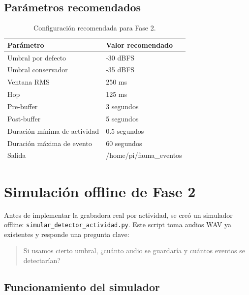 \documentclass[11pt,letterpaper]{article}
\newcommand{\archivo}[1]{\texttt{#1}}
\begin{document}
\subsection{Parámetros recomendados}

\begin{table}[H]
\centering
\begin{tabular}{ll}
\toprule
Parámetro & Valor recomendado \\
\midrule
Umbral por defecto & -30 dBFS \\
Umbral conservador & -35 dBFS \\
Ventana RMS & 250 ms \\
Hop & 125 ms \\
Pre-buffer & 3 segundos \\
Post-buffer & 5 segundos \\
Duración mínima de actividad & 0.5 segundos \\
Duración máxima de evento & 60 segundos \\
Salida & /home/pi/fauna\_eventos \\
\bottomrule
\end{tabular}
\caption{Configuración recomendada para Fase 2.}
\end{table}

\section{Simulación offline de Fase 2}

Antes de implementar la grabadora real por actividad, se creó un simulador offline: \archivo{simular\_detector\_actividad.py}. Este script toma audios WAV ya existentes y responde una pregunta clave:

\begin{quote}
Si usamos cierto umbral, ¿cuánto audio se guardaría y cuántos eventos se detectarían?
\end{quote}

\subsection{Funcionamiento del simulador}

\begin{center}
\end{center}
\end{document}
